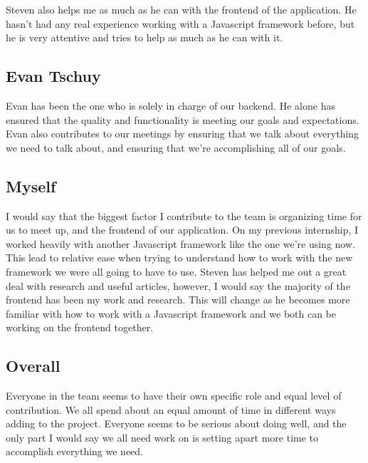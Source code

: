 \documentclass[onecolumn, draftclsnofoot,10pt, compsoc]{IEEEtran}
\begin{document}
Steven also helps me as much as he can with the frontend of the application. He hasn't had any real experience working with a Javascript 
framework before, but he is very attentive and tries to help as much as he can with it. \\

\subsection{Evan Tschuy}
Evan has been the one who is solely in charge of our backend. He alone has ensured that the quality and functionality is meeting 
our goals and expectations. Evan also contributes to our meetings by ensuring that we talk about everything we need to talk about, 
and ensuring that we're accomplishing all of our goals. \\

\subsection{Myself}
I would say that the biggest factor I contribute to the team is organizing time for us to meet up, and the frontend of our application. 
On my previous internship, I worked heavily with another Javascript framework like the one we're using now. This lead to relative ease
when trying to understand how to work with the new framework we were all going to have to use. Steven has helped me out a great deal with 
research and useful articles, however, I would say the majority of the frontend has been my work and research. This will change as he 
becomes more familiar with how to work with a Javascript framework and we both can be working on the frontend together.  \\

\subsection{Overall}
Everyone in the team seems to have their own specific role and equal level of contribution. We all spend about an equal amount of time in 
different ways adding to the project. Everyone seems to be serious about doing well, and the only part I would say we all need work on is 
setting apart more time to accomplish everything we need. \\
\afterpage{\clearpage}
\end{document}
